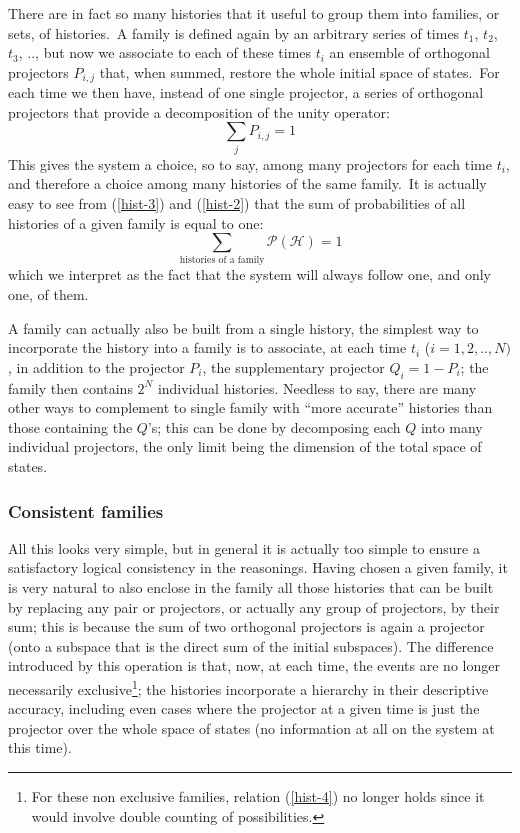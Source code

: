 \documentclass[12pt,onecolumn]{article}%
\begin{document}
There are in fact so many histories that it useful to group them into
families, or sets, of histories.\ A family is defined again by an arbitrary
series of times $t_{1}$, $t_{2}$, $t_{3}$, .., but now we associate to each of
these times $t_{i}$ an ensemble of orthogonal projectors $P_{i,j}$ that, when
summed, restore the whole initial space of states.\ For each time we then
have, instead of one single projector, a series of orthogonal projectors that
provide a decomposition of the unity operator:%
\begin{equation}
\sum_{j}P_{i,j}=1 \label{hist-3}%
\end{equation}
This gives the system a choice, so to say, among many projectors for each time
$t_{i}$, and therefore a choice among many histories of the same family.\ It
is actually easy to see from (\ref{hist-3}) and (\ref{hist-2}) that the sum of
probabilities of all histories of a given family is equal to one:%
\begin{equation}
\sum_{\text{histories of a family}}\mathcal{P}(\mathcal{H})=1 \label{hist-4}%
\end{equation}
which we interpret as the fact that the system will always follow one, and
only one, of them.

A family can actually also be built from a single history, the simplest way to
incorporate the history into a family is to associate, at each time $t_{i}$
($i=1,2,..,N)$, in addition to the projector $P_{i}$, the supplementary
projector $Q_{i}=1-P_{i}$; the family then contains $2^{N}$ individual
histories. Needless to say, there are many other ways to complement to single
family with ``more accurate'' histories than those containing the $Q$'s; this
can be done by decomposing each $Q$ into many individual projectors, the only
limit being the dimension of the total space of states.

\subsubsection{Consistent families}

All this looks very simple, but in general it is actually too simple to ensure
a satisfactory logical consistency in the reasonings. Having chosen a given
family, it is very natural to also enclose in the family all those histories
that can be built by replacing any pair or projectors, or actually any group
of projectors, by their sum; this is because the sum of two orthogonal
projectors is again a projector (onto a subspace that is the direct sum of the
initial subspaces). The difference introduced by this operation is that, now,
at each time, the events are no longer necessarily exclusive\footnote{For
these non exclusive families, relation (\ref{hist-4}) no longer holds since it
would involve double counting of possibilities.}; the histories incorporate a
hierarchy in their descriptive accuracy, including even cases where the
projector at a given time is just the projector over the whole space of states
(no information at all on the system at this time).
\end{document}
